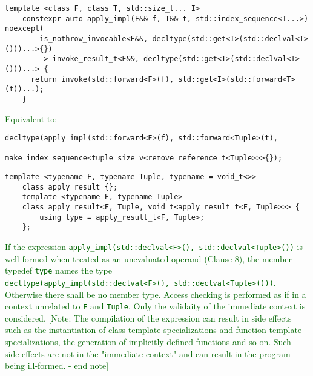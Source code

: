 \documentclass{article}
\begin{document}
\begin{lstlisting}[style=base]
    template <class F, class T, std::size_t... I>
    constexpr auto apply_impl(F&& f, T&& t, std::index_sequence<I...>) noexcept(
        is_nothrow_invocable<F&&, decltype(std::get<I>(std::declval<T>()))...>{})
        -> invoke_result_t<F&&, decltype(std::get<I>(std::declval<T>()))...> {
      return invoke(std::forward<F>(f), std::get<I>(std::forward<T>(t))...);
    }
\end{lstlisting}

\textcolor{darkgreen}{Equivalent to:}

\begin{lstlisting}[style=base]
    decltype(apply_impl(std::forward<F>(f), std::forward<Tuple>(t),
             make_index_sequence<tuple_size_v<remove_reference_t<Tuple>>>{});
\end{lstlisting}

\begin{lstlisting}[style=base]
    template <typename F, typename Tuple, typename = void_t<>>
    class apply_result {};
    template <typename F, typename Tuple>
    class apply_result<F, Tuple, void_t<apply_result_t<F, Tuple>>> {
  	    using type = apply_result_t<F, Tuple>;
    };
\end{lstlisting}

\textcolor{darkgreen}{If the expression \texttt{apply\_impl(std::declval<F>(),
std::declval<Tuple>())} is well-formed when treated as an unevaluated operand
(Clause 8), the member typedef \texttt{type} names the type
\\\texttt{decltype(apply\_impl(std::declval<F>(), std::declval<Tuple>()))}.
Otherwise there shall be no member type.  Access checking is performed as if
in a context unrelated to \texttt{F} and \texttt{Tuple}.  Only the validaity
of the immediate context is considered.  [Note: The compilation of the
expression can result in side effects such as the instantiation of class
template specializations and function template specializations, the generation
of implicitly-defined functions and so on.  Such side-effects are not in the
"immediate context" and can result in the program being ill-formed.  - end
note]}
\end{document}
